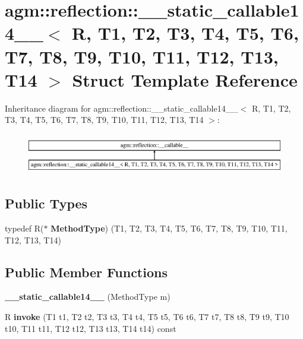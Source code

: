 \hypertarget{structagm_1_1reflection_1_1____static__callable14____}{}\section{agm\+:\+:reflection\+:\+:\+\_\+\+\_\+static\+\_\+callable14\+\_\+\+\_\+$<$ R, T1, T2, T3, T4, T5, T6, T7, T8, T9, T10, T11, T12, T13, T14 $>$ Struct Template Reference}
\label{structagm_1_1reflection_1_1____static__callable14____}
Inheritance diagram for agm\+:\+:reflection\+:\+:\+\_\+\+\_\+static\+\_\+callable14\+\_\+\+\_\+$<$ R, T1, T2, T3, T4, T5, T6, T7, T8, T9, T10, T11, T12, T13, T14 $>$\+:\begin{figure}[H]
\begin{center}
\leavevmode
\includegraphics[height=1.809370cm]{structagm_1_1reflection_1_1____static__callable14____}
\end{center}
\end{figure}
\subsection*{Public Types}
\begin{DoxyCompactItemize}
\item 
typedef R($\ast$ {\bfseries Method\+Type}) (T1, T2, T3, T4, T5, T6, T7, T8, T9, T10, T11, T12, T13, T14)\hypertarget{structagm_1_1reflection_1_1____static__callable14_____af356edb66a6a3ccf0ce35f5faaacda5b}{}\label{structagm_1_1reflection_1_1____static__callable14_____af356edb66a6a3ccf0ce35f5faaacda5b}

\end{DoxyCompactItemize}
\subsection*{Public Member Functions}
\begin{DoxyCompactItemize}
\item 
{\bfseries \+\_\+\+\_\+static\+\_\+callable14\+\_\+\+\_\+} (Method\+Type m)\hypertarget{structagm_1_1reflection_1_1____static__callable14_____a858002273d954b7fad5ab0c6bb92ce95}{}\label{structagm_1_1reflection_1_1____static__callable14_____a858002273d954b7fad5ab0c6bb92ce95}

\item 
R {\bfseries invoke} (T1 t1, T2 t2, T3 t3, T4 t4, T5 t5, T6 t6, T7 t7, T8 t8, T9 t9, T10 t10, T11 t11, T12 t12, T13 t13, T14 t14) const \hypertarget{structagm_1_1reflection_1_1____static__callable14_____ab16a6ae812d951a2166d2880e8389add}{}\label{structagm_1_1reflection_1_1____static__callable14_____ab16a6ae812d951a2166d2880e8389add}

\end{DoxyCompactItemize}
